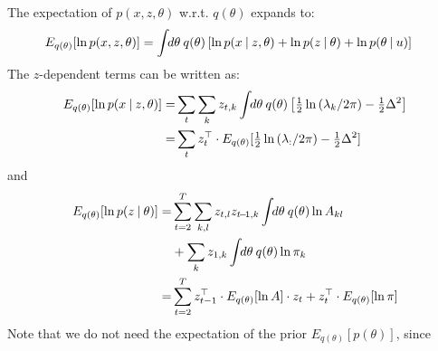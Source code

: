 The expectation of $p(x, z, \theta)$ w.r.t. $q(\theta)$ expands to:
\begin{align}
  E_{q(\theta)} [ \ln p(x, z, \theta) ]
  & =
  \int \!\!d\theta \: 
  q(\theta)
  \left[
  \ln p(x \:|\: z, \theta) 
  + \ln p(z \:|\: \theta)
  + \ln p(\theta \:|\: u)
  \right]
\end{align}
The $z$-dependent terms can be written as:
\begin{align}
  \begin{split}
    E_{q(\theta)} [ \ln p(x \:|\: z, \theta) ]
    = &  
    \sum_t \sum_k 
    z_{t,k} 
    \int \!\!d\theta \: q(\theta)
    \left[
      \tfrac{1}{2} \ln \left( \lambda_{k} / 2\pi \right)
      - \tfrac{1}{2} \Delta^2
    \right] \\
    = &  
    \sum_t  
    z_{t}^{\top} 
    \cdot 
    E_{q(\theta)} [ \tfrac{1}{2} \ln \left( \lambda_{:} / 2\pi \right)
                            - \tfrac{1}{2} \Delta^2]
  \end{split}
\end{align}
and
\begin{align}
  \begin{split}
    E_{q(\theta)} [ \ln p(z \:|\: \theta) ] 
    = & 
    \sum_{t=2}^{T}
    \sum_{k,l}
    z_{t,l} z_{t \!-\! 1,k} 
    \int \!\!d\theta \: q(\theta)
    \ln A_{kl} \\
    & +
    \sum_k
    z_{1,k}
    \int \!\!d\theta \: q(\theta)
    \ln \pi_{k} \\
    = & 
    \sum_{t=2}^{T}
    z_{t - 1}^{\top} 
    \cdot
    E_{q(\theta)} [ \ln A ]
    \cdot 
    z_{t} 
    + z_{t}^{\top} 
    \cdot 
    E_{q(\theta)} [\ln \pi] 
  \end{split}
\end{align}
Note that we do not need the expectation of the prior $E_{q(\theta)}[p(\theta)]$, since
